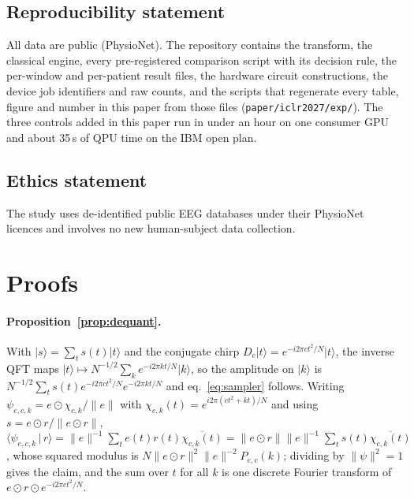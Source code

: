 \documentclass{article}
\newcommand{\ket}[1]{\lvert #1\rangle}
\newcommand{\braket}[2]{\langle #1\,|\,#2\rangle}
\newcommand{\norm}[1]{\lVert #1\rVert}
\begin{document}
\subsection*{Reproducibility statement}
All data are public (PhysioNet). The repository contains the transform, the classical engine, every pre-registered comparison script with its decision rule, the per-window and per-patient result files, the hardware circuit constructions, the device job identifiers and raw counts, and the scripts that regenerate every table, figure and number in this paper from those files (\texttt{paper/iclr2027/exp/}). The three controls added in this paper run in under an hour on one consumer GPU and about 35\,s of QPU time on the IBM open plan.

\subsection*{Ethics statement}
The study uses de-identified public EEG databases under their PhysioNet licences and involves no new human-subject data collection.




\appendix
\section{Proofs}
\label{app:proofs}
\paragraph{Proposition~\ref{prop:dequant}.} With $\ket{s}=\sum_t s(t)\ket{t}$ and the conjugate chirp $D_c\ket{t}=e^{-i2\pi ct^2/N}\ket{t}$, the inverse QFT maps $\ket{t}\mapsto N^{-1/2}\sum_k e^{-i2\pi kt/N}\ket{k}$, so the amplitude on $\ket{k}$ is $N^{-1/2}\sum_t s(t)e^{-i2\pi ct^2/N}e^{-i2\pi kt/N}$ and eq.~\eqref{eq:sampler} follows. Writing $\psi_{e,c,k}=e\odot\chi_{c,k}/\norm{e}$ with $\chi_{c,k}(t)=e^{i2\pi(ct^2+kt)/N}$ and using $s=e\odot r/\norm{e\odot r}$, $\braket{\psi_{e,c,k}}{r}=\norm{e}^{-1}\sum_t e(t)r(t)\overline{\chi_{c,k}(t)}=\norm{e\odot r}\norm{e}^{-1}\sum_t s(t)\overline{\chi_{c,k}(t)}$, whose squared modulus is $N\norm{e\odot r}^2\norm{e}^{-2}P_{e,c}(k)$; dividing by $\norm{\psi}^2=1$ gives the claim, and the sum over $t$ for all $k$ is one discrete Fourier transform of $e\odot r\odot e^{-i2\pi ct^2/N}$.
\end{document}
